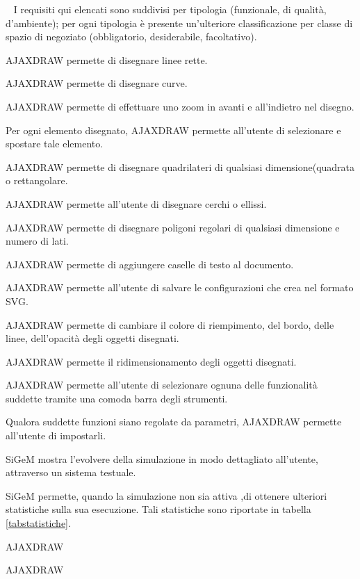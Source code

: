 \
\label{listarequisiti}
I requisiti qui elencati sono suddivisi per tipologia (funzionale, di qualit\`a, d'ambiente); 
per ogni tipologia \`e presente un'ulteriore classificazione per classe di spazio di negoziato (obbligatorio, desiderabile, facoltativo). 
\subsezione{Requisiti funzionali (RF)}
\begin{elenconumerato}[\textbf{RFO-}]{\subsubsecindent}
\item{AJAXDRAW permette di disegnare linee rette.}
\item{AJAXDRAW permette di disegnare curve.}
\item{AJAXDRAW permette di effettuare uno zoom in avanti e all'indietro nel disegno.}
\item{Per ogni elemento disegnato, AJAXDRAW permette all'utente di selezionare e spostare tale elemento.}
\item{AJAXDRAW permette di disegnare quadrilateri di qualsiasi dimensione(quadrata o rettangolare.}
\item{AJAXDRAW permette all'utente di disegnare cerchi o ellissi.}
\item{AJAXDRAW permette di disegnare poligoni regolari di qualsiasi dimensione e numero di lati.}
\item{AJAXDRAW permette di aggiungere caselle di testo al documento. }
\item{AJAXDRAW permette all'utente di salvare le configurazioni che crea nel formato SVG.}
\item{AJAXDRAW permette di cambiare il colore di riempimento, del bordo, delle linee, dell'opacità degli oggetti disegnati.}
\item{AJAXDRAW permette il ridimensionamento degli oggetti disegnati.}
\item{AJAXDRAW permette all'utente di selezionare ognuna delle funzionalit\`a suddette tramite una comoda barra degli strumenti.}
\item{Qualora suddette funzioni siano regolate da parametri, AJAXDRAW permette all'utente di impostarli.}
\item{SiGeM mostra l'evolvere della simulazione in modo dettagliato all'utente, attraverso un sistema testuale.}
\item{SiGeM permette, quando la simulazione non sia attiva ,di ottenere ulteriori statistiche sulla sua esecuzione. Tali statistiche sono riportate in tabella \ref{tabstatistiche}.}
\end{elenconumerato}

\begin{elenconumerato}[\textbf{RFD-}]{\subsubsecindent}
\item{AJAXDRAW }
\end{elenconumerato}
\begin{elenconumerato}[\textbf{RFF-}]{\subsubsecindent}
\item{AJAXDRAW}
\end{elenconumerato}


\newpage
